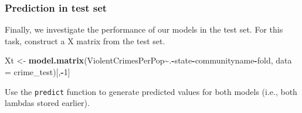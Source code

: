 \documentclass[
]{article}
\newenvironment{Shaded}{\begin{snugshade}}{\end{snugshade}}
\newcommand{\AttributeTok}[1]{\textcolor[rgb]{0.13,0.29,0.53}{#1}}
\newcommand{\CommentTok}[1]{\textcolor[rgb]{0.56,0.35,0.01}{\textit{#1}}}
\newcommand{\DecValTok}[1]{\textcolor[rgb]{0.00,0.00,0.81}{#1}}
\newcommand{\FloatTok}[1]{\textcolor[rgb]{0.00,0.00,0.81}{#1}}
\newcommand{\FunctionTok}[1]{\textcolor[rgb]{0.13,0.29,0.53}{\textbf{#1}}}
\newcommand{\NormalTok}[1]{#1}
\newcommand{\OtherTok}[1]{\textcolor[rgb]{0.56,0.35,0.01}{#1}}
\newcommand{\SpecialCharTok}[1]{\textcolor[rgb]{0.81,0.36,0.00}{\textbf{#1}}}
\newcommand{\StringTok}[1]{\textcolor[rgb]{0.31,0.60,0.02}{#1}}
\begin{document}
\begin{Shaded}
\end{Shaded}

\hypertarget{prediction-in-test-set}{%
\subsubsection{Prediction in test set}\label{prediction-in-test-set}}

Finally, we investigate the performance of our models in the test set.
For this task, construct a X matrix from the test set.

\begin{Shaded}
\begin{Highlighting}[]
\NormalTok{Xt }\OtherTok{\textless{}{-}} \FunctionTok{model.matrix}\NormalTok{(ViolentCrimesPerPop}\SpecialCharTok{\textasciitilde{}}\NormalTok{.}\SpecialCharTok{{-}}\NormalTok{state}\SpecialCharTok{{-}}\NormalTok{communityname}\SpecialCharTok{{-}}\NormalTok{fold, }
                  \AttributeTok{data =}\NormalTok{ crime\_test)[,}\SpecialCharTok{{-}}\DecValTok{1}\NormalTok{]}
\end{Highlighting}
\end{Shaded}

Use the \texttt{predict} function to generate predicted values for both
models (i.e., both lambdas stored earlier).

\begin{Shaded}
\end{Shaded}
\end{document}
